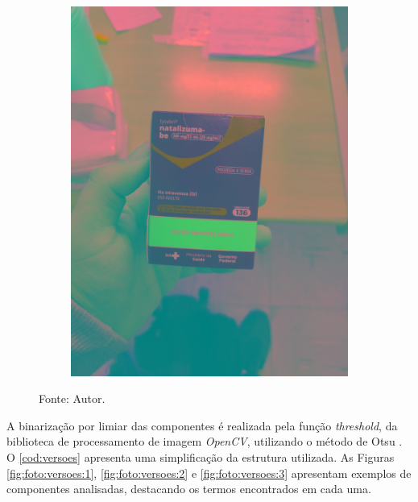 \begin{figure}[htb]
\begin{subfigure}[t]{0.22\textwidth}
        \includegraphics[width=\linewidth]{../pictures/tysabri_YCrCb.jpg}
    \end{subfigure}
    \caption*{Fonte: Autor.}
    \label{fig:foto:codf}
\end{figure}

A binarização por limiar das componentes é realizada pela função \textit{threshold}, da biblioteca de processamento de imagem \textit{OpenCV}, utilizando o método de Otsu \cite{CV2threshold}.
O \autoref{cod:versoes} apresenta uma simplificação da estrutura utilizada.
As Figuras \ref{fig:foto:versoes:1}, \ref{fig:foto:versoes:2} e \ref{fig:foto:versoes:3} apresentam exemplos de componentes analisadas, destacando os termos encontrados em cada uma.


\begin{lstfloat}[htbp]
    \centering
    
    \caption*{Fonte: Autor.}
\end{lstfloat}

